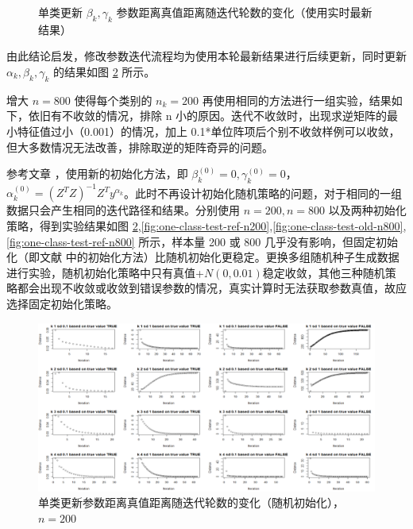 \documentclass[12pt, a4paper, oneside]{article}
\numberwithin{equation}{section}
\begin{document}
\begin{figure}
	\centering
	\caption{单类更新 $\beta_k, \gamma_k$ 参数距离真值距离随迭代轮数的变化（使用实时最新结果）}
	\label{fig:beta-gamma-latest}
\end{figure}


由此结论启发，修改参数迭代流程均为使用本轮最新结果进行后续更新，同时更新 $\alpha_k, \beta_k, \gamma_k$ 的结果如图 \ref{fig:one-class-test-old-n200} 所示。



增大 $n=800$ 使得每个类别的 $n_k = 200$ 再使用相同的方法进行一组实验，结果如下，依旧有不收敛的情况，排除 n 小的原因。迭代不收敛时，出现求逆矩阵的最小特征值过小（0.001）的情况，加上 0.1*单位阵项后个别不收敛样例可以收敛，但大多数情况无法改善，排除取逆的矩阵奇异的问题。

参考文章 \cite{wu2020structured}，使用新的初始化方法，即 $\beta_k^{(0)}=0, \gamma_k^{(0)}=0$，$\alpha_k^{(0)} = (Z^TZ)^{-1}Z^Ty^{\alpha_k}$。此时不再设计初始化随机策略的问题，对于相同的一组数据只会产生相同的迭代路径和结果。分别使用 $n=200,n=800$ 以及两种初始化策略，得到实验结果如图 \ref{fig:one-class-test-old-n200},\ref{fig:one-class-test-ref-n200},\ref{fig:one-class-test-old-n800},\ref{fig:one-class-test-ref-n800} 所示，样本量 200 或 800 几乎没有影响，但固定初始化（即文献 \cite{wu2020structured} 中的初始化方法）比随机初始化更稳定。更换多组随机种子生成数据进行实验，随机初始化策略中只有真值+$N(0,0.01)$稳定收敛，其他三种随机策略都会出现不收敛或收敛到错误参数的情况，真实计算时无法获取参数真值，故应选择固定初始化策略。

\begin{figure}
	\centering
	\includegraphics[width=\linewidth]{img/one_class_test_old_n200.png}
	\caption{单类更新参数距离真值距离随迭代轮数的变化（随机初始化），$n=200$}
	\label{fig:one-class-test-old-n200}
\end{figure}
\end{document}
